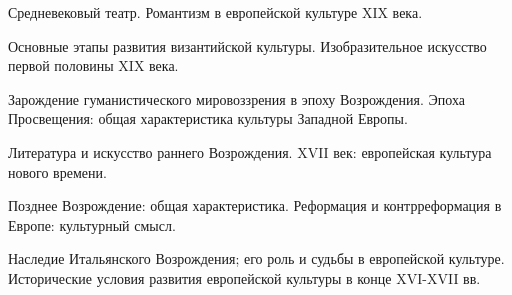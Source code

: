 \newpage


\shapkFull
\setcounter{zad}{0}

\z Средневековый театр.
 \medskip
\z Романтизм в европейской культуре XIX века.
 \medskip

\newpage


\shapkFull
\setcounter{zad}{0}

\z Основные этапы развития византийской культуры.
 \medskip
\z Изобразительное искусство первой половины XIX века.
 \medskip

\newpage


\shapkFull
\setcounter{zad}{0}

\z Зарождение гуманистического мировоззрения в эпоху Возрождения.
 \medskip
\z Эпоха Просвещения: общая характеристика культуры Западной Европы.
 \medskip

\newpage


\shapkFull
\setcounter{zad}{0}

\z Литература и искусство раннего Возрождения.
 \medskip
\z XVII век: европейская культура нового времени.
 \medskip

\newpage


\shapkFull
\setcounter{zad}{0}

\z Позднее Возрождение: общая характеристика.
 \medskip
\z Реформация и контрреформация в Европе: культурный смысл.
 \medskip

\newpage


\shapkFull
\setcounter{zad}{0}

\z Наследие Итальянского Возрождения; его роль и судьбы в европейской культуре.
 \medskip
\z Исторические условия развития европейской культуры в конце XVI-XVII вв.
 \medskip

\newpage